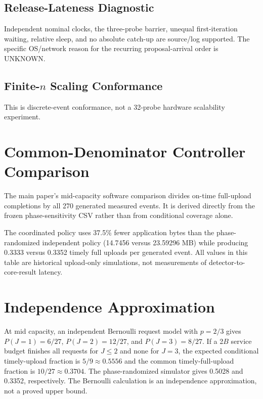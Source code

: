 \documentclass[10pt,onecolumn]{IEEEtran}
\begin{document}
\begin{landscape}
\section{Release-Lateness Diagnostic}
Independent nominal clocks, the three-probe barrier, unequal first-iteration waiting, relative sleep, and no absolute catch-up are source/log supported. The specific OS/network reason for the recurring proposal-arrival order is UNKNOWN.
\small\end{landscape}

\begin{landscape}
\section{Finite-$n$ Scaling Conformance}
This is discrete-event conformance, not a 32-probe hardware scalability experiment.
\small\end{landscape}


\section{Common-Denominator Controller Comparison}
The main paper's mid-capacity software comparison divides on-time full-upload completions by
all 270 generated measured events. It is derived directly from the frozen
phase-sensitivity CSV rather than from conditional coverage alone.
\begin{table}[h]\centering\caption{Mid-capacity common-denominator software sensitivity.}

\end{table}
The coordinated policy uses 37.5\% fewer application bytes than the phase-
randomized independent policy (14.7456 versus 23.59296 MB) while producing
0.3333 versus 0.3352 timely full uploads per generated event. All values in
this table are historical upload-only simulations, not measurements of
detector-to-core-result latency.

\section{Independence Approximation}
At mid capacity, an independent Bernoulli request model with $p=2/3$ gives
$P(J=1)=6/27$, $P(J=2)=12/27$, and $P(J=3)=8/27$. If a 2$B$ service budget
finishes all requests for $J\leq2$ and none for $J=3$, the expected conditional
timely-upload fraction is $5/9\approx0.5556$ and the common timely-full-upload fraction is
$10/27\approx0.3704$. The phase-randomized simulator gives 0.5028 and 0.3352,
respectively. The Bernoulli calculation is an independence approximation, not
a proved upper bound.
\end{document}
